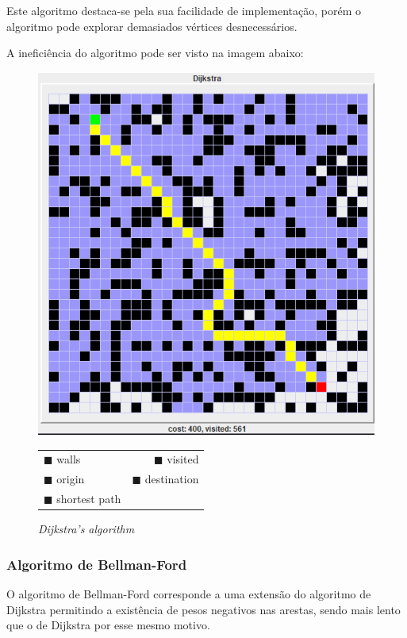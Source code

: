\documentclass[article, a4paper, 12pt, oneside]{memoir}
\begin{document}
Este algoritmo destaca-se pela sua facilidade de implementação, porém o algoritmo pode explorar demasiados vértices desnecessários.

A ineficiência do algoritmo pode ser visto na imagem abaixo:

\begin{figure}[h]
\centering
\includegraphics[scale=0.4]{dijkstra}
\caption{\emph{Dijkstra's algorithm}}
\begin{tabular}{ l r }
\color{black} $\blacksquare$ \color{black} walls & \color{Periwinkle} $\blacksquare$ \color{black} visited \\
\color{green} $\blacksquare$ \color{black} origin & \color{red} $\blacksquare$ \color{black} destination \\
\color{yellow} $\blacksquare$ \color{black} shortest path
\end{tabular}
\end{figure}

\subsubsection{Algoritmo de Bellman-Ford}
O algoritmo de Bellman-Ford corresponde a uma extensão do algoritmo de Dijkstra permitindo a existência de pesos negativos nas arestas, sendo mais lento que o de Dijkstra por esse mesmo motivo.
\end{document}
